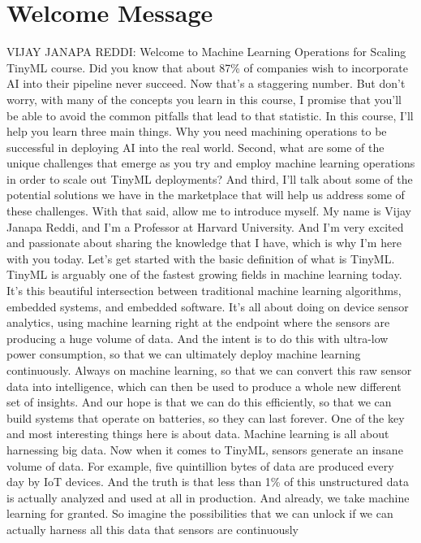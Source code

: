 \section{Welcome Message}
VIJAY JANAPA REDDI: Welcome to Machine Learning Operations for Scaling TinyML
course.
Did you know that about 87\% of companies wish to incorporate AI
into their pipeline never succeed.
Now that's a staggering number.
But don't worry, with many of the concepts you learn in this course,
I promise that you'll be able to avoid the common pitfalls that
lead to that statistic.
In this course, I'll help you learn three main things.
Why you need machining operations to be successful in deploying AI
into the real world.
Second, what are some of the unique challenges that
emerge as you try and employ machine learning operations in order
to scale out TinyML deployments?
And third, I'll talk about some of the potential solutions
we have in the marketplace that will help
us address some of these challenges.
With that said, allow me to introduce myself.
My name is Vijay Janapa Reddi, and I'm a Professor at Harvard University.
And I'm very excited and passionate about sharing
the knowledge that I have, which is why I'm here with you today.
Let's get started with the basic definition of what is TinyML.
TinyML is arguably one of the fastest growing fields
in machine learning today.
It's this beautiful intersection between traditional machine
learning algorithms, embedded systems, and embedded software.
It's all about doing on device sensor analytics,
using machine learning right at the endpoint
where the sensors are producing a huge volume of data.
And the intent is to do this with ultra-low power consumption,
so that we can ultimately deploy machine learning continuously.
Always on machine learning, so that we can convert this raw sensor
data into intelligence, which can then be used to produce
a whole new different set of insights.
And our hope is that we can do this efficiently,
so that we can build systems that operate
on batteries, so they can last forever.
One of the key and most interesting things here is about data.
Machine learning is all about harnessing big data.
Now when it comes to TinyML, sensors generate an insane volume of data.
For example, five quintillion bytes of data
are produced every day by IoT devices.
And the truth is that less than 1\% of this unstructured data
is actually analyzed and used at all in production.
And already, we take machine learning for granted.
So imagine the possibilities that we can unlock
if we can actually harness all this data that sensors are continuously
